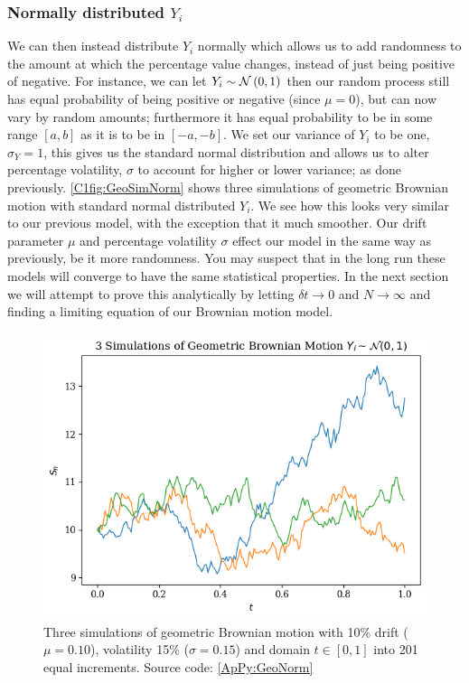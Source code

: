 \subsubsection{Normally distributed \(Y_i\)}

We can then instead distribute \(Y_i\) normally which allows us to add randomness to the amount at which the percentage value changes, instead of just being positive of negative. For instance, we can let \(Y_i \sim \mathcal{N}\left(0,1\right)\) then our random process still has equal probability of being positive or negative (since \(\mu = 0\)), but can now vary by random amounts; furthermore it has equal probability to be in some range \([a, b]\) as it is to be in \([-a, -b]\). We set our variance of \(Y_i\) to be one, \(\sigma_Y = 1\), this gives us the standard normal distribution and allows us to alter percentage volatility, \(\sigma \) to account for higher or lower variance; as done previously. \autoref{C1fig:GeoSimNorm} shows three simulations of geometric Brownian motion with standard normal distributed \(Y_i\).
\nline{}
We see how this looks very similar to our previous model, with the exception that it much smoother. Our drift parameter \(\mu \) and percentage volatility \(\sigma \) effect our model in the same way as previously, be it more randomness. You may suspect that in the long run these models will converge to have the same statistical properties. In the next section we will attempt to prove this analytically by letting \(\delta t \rightarrow 0\) and \(N \rightarrow \infty \) and finding a limiting equation of our Brownian motion model.

\begin{figure}[H]
    \centering
    \includegraphics[width=\sOneSize\textwidth]{Chapters/C1/plots/BM_Norm_Simulations.png}
    \caption{Three simulations of geometric Brownian motion with 10\% drift (\(\mu = 0.10\)), volatility 15\% (\(\sigma = 0.15\)) and domain \(t\in[0,1]\) into 201 equal increments. Source code: \autoref{ApPy:GeoNorm}}\label{C1fig:GeoSimNorm}
\end{figure}

